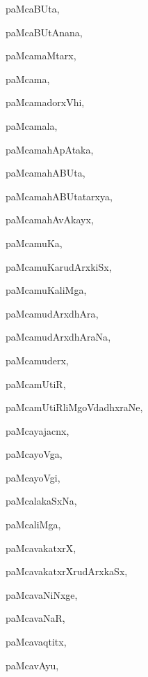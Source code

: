 \begin{multicols}{3}
{\noindent
{paMcaBUta}, \pageref{paMcaBUta2}

\noindent
{paMcaBUtAnana}, \pageref{paMcaBUtAnana}

\noindent
{paMcamaMtarx}, \pageref{paMcamaMtarx}

\noindent
{paMcama}, \pageref{paMcama}

\noindent
{paMcamadorxVhi}, \pageref{paMcamadorxVhi}

\noindent
{paMcamala}, \pageref{paMcamala}

\noindent
{paMcamahApAtaka}, \pageref{paMcamahApAtaka}

\noindent
{paMcamahABUta}, \pageref{paMcamahABUta}

\noindent
{paMcamahABUtatarxya}, \pageref{paMcamahABUtatarxya}

\noindent
{paMcamahAvAkayx}, \pageref{paMcamahAvAkayx}

\noindent
{paMcamuKa}, \pageref{paMcamuKa}

\noindent
{paMcamuKarudArxkiSx}, \pageref{paMcamuKarudArxkiSx}

\noindent
{paMcamuKaliMga}, \pageref{paMcamuKaliMga}

\noindent
{paMcamudArxdhAra}, \pageref{paMcamudArxdhAra}

\noindent
{paMcamudArxdhAraNa}, \pageref{paMcamudArxdhAraNa}

\noindent
{paMcamuderx}, \pageref{paMcamuderx}

\noindent
{paMcamUtiR}, \pageref{paMcamUtiR}

\noindent
{paMcamUtiRliMgoVdadhxraNe}, \pageref{paMcamUtiRliMgoVdadhxraNe}

\noindent
{paMcayajacnx}, \pageref{paMcayajacnx}

\noindent
{paMcayoVga}, \pageref{paMcayoVga}

\noindent
{paMcayoVgi}, \pageref{paMcayoVgi}

\noindent
{paMcalakaSxNa}, \pageref{paMcalakaSxNa}

\noindent
{paMcaliMga}, \pageref{paMcaliMga}

\noindent
{paMcavakatxrX}, \pageref{paMcavakatxrX}

\noindent
{paMcavakatxrXrudArxkaSx}, \pageref{paMcavakatxrXrudArxkaSx}

\noindent
{paMcavaNiNxge}, \pageref{paMcavaNiNxge}

\noindent
{paMcavaNaR}, \pageref{paMcavaNaR}

\noindent
{paMcavaqtitx}, \pageref{paMcavaqtitx}

\noindent
{paMcavAyu}, \pageref{paMcavAyu}

}
\end{multicols}
